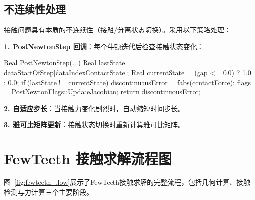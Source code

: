 \documentclass[12pt]{ctexart}
\begin{document}
\subsection{不连续性处理}

接触问题具有本质的不连续性（接触/分离状态切换）。采用以下策略处理：

\textbf{1. PostNewtonStep 回调}：每个牛顿迭代后检查接触状态变化：
\begin{cppcode}[不连续性检测]
Real PostNewtonStep(...) {
    Real lastState = dataStartOfStep[dataIndexContactState];
    Real currentState = (gap <= 0.0) ? 1.0 : 0.0;
    if (lastState != currentState) {
        discontinuousError = fabs(contactForce);
        flags = PostNewtonFlags::UpdateJacobian;
    }
    return discontinuousError;
}
\end{cppcode}

\textbf{2. 自适应步长}：当接触力变化剧烈时，自动缩短时间步长。

\textbf{3. 雅可比矩阵更新}：接触状态切换时重新计算雅可比矩阵。

\section{FewTeeth 接触求解流程图}

图~\ref{fig:fewteeth_flow}展示了FewTeeth接触求解的完整流程，包括几何计算、接触检测与力计算三个主要阶段。
\end{document}
